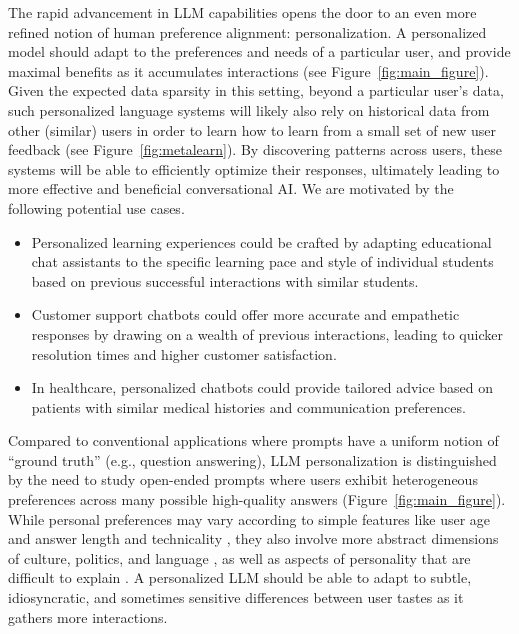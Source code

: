 The rapid advancement in LLM capabilities opens the door to an even more refined notion of human preference alignment: personalization.
A personalized model should adapt to the preferences and needs of a particular user, and provide maximal benefits as it accumulates interactions (see Figure~\ref{fig:main_figure}).
Given the expected data sparsity in this setting, beyond a particular user's data, such personalized language systems will likely also rely on historical data from other (similar) users in order to learn how to learn from a small set of new user feedback (see Figure~\ref{fig:metalearn}).
By discovering patterns across users, these systems will be able to efficiently optimize their responses, ultimately leading to more effective and beneficial conversational AI. 
We are motivated by the following potential use cases.
\begin{itemize}
\item Personalized learning experiences could be crafted by adapting educational chat assistants to the specific learning pace and style of individual students based on previous successful interactions with similar students.  
\item 
Customer support chatbots could offer more accurate and empathetic responses by drawing on a wealth of previous interactions, leading to quicker resolution times and higher customer satisfaction. 
\item In healthcare, personalized chatbots could provide tailored advice based on patients with similar medical histories and communication preferences. 
\end{itemize}

Compared to conventional applications where prompts have a uniform notion of ``ground truth'' (e.g., question answering),
LLM personalization is distinguished by the need to study open-ended prompts where users exhibit heterogeneous preferences across many possible high-quality answers (Figure~\ref{fig:main_figure}).
While personal preferences may vary according to simple features like user age \cite{chan2024scalingsyntheticdatacreation, castricato2024personareproducibletestbedpluralistic} and answer length and technicality \cite{li2024personalizedlanguagemodelingpersonalized}, they also involve more abstract dimensions of culture, politics, and language \cite{kirk2024prismalignmentprojectparticipatory}, as well as aspects of personality that are difficult to explain \citep{hwang2023aligninglanguagemodelsuser}.
A personalized LLM should be able to adapt to 
subtle, idiosyncratic, and sometimes sensitive differences between user tastes as it gathers more interactions.

